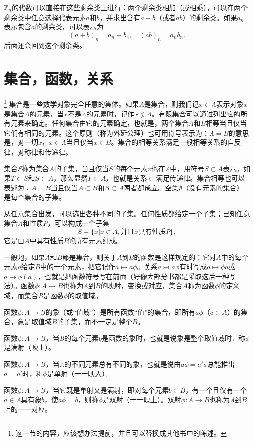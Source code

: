 $\mathbb{Z}_n$的代数可以直接在这些剩余类上进行：两个剩余类相加（或相乘），可以在两个剩余类中任意选择代表元素$a$和$b$，并求出含有$a+b$（或者$ab$）的剩余类。如果$a_n$表示包含$a$的剩余类，可以表示为
\[
(a+b)_n = a_n + b_n, \quad (ab)_n = a_nb_n.
\]
后面还会回到这个剩余类。


\section{集合，函数，关系}\label{subsection0010111}\footnote{这一节的内容，应该想办法提前，并且可以替换成其他书中的陈述。}
集合是一些数学对象完全任意的集体。如果$A$是集合，则我们记$x \in A$表示对象$x$是集合$A$的元素，当$x$不是$A$的元素时，记作$x \not\in A$。有限集合可以通过列出它的所有元素来确定。任何集合由它的元素确定，也就是，两个集合$A$和$B$相等当且仅当它们有相同的元素。这个原则（称为外延公理）也可用符号表示为：$A=B$的意思是，对一切$x$，$x \in A$当且仅当$x \in B$。集合的相等关系满足一般相等关系的自反律，对称律和传递律。

集合$S$称为集合$A$的子集，当且仅当$S$的每个元素$x$也在$A$中，用符号$S \subset A$表示。如果$T \subset S$和$S \subset A$，那么显然$T \subset A$，也就是关系$\subset$满足传递律。集合相等也可以表述为：$A=B$当且仅当$A \subset B$和$B \subset A$两者都成立。空集$\emptyset$（没有元素的集合）是每个集合的子集。

从任意集合出发，可以选出各种不同的子集。任何性质都给定一个子集；已知任意集合$A$和性质$P$，可以构成一个子集
\[
S = \{x | x \in A, \text{并且}x\text{具有性质}P\},
\]
它是由$A$中具有性质$P$的所有元素组成。

一般地，如果$A$和$B$都是集合，则关于$A$到$B$的函数是这样规定的：它对$A$中的每个元素$a$给定$B$中的一个元素，把它记作$a \mapsto a\phi$。关系$a \mapsto a\phi$有时写成$a \mapsto \phi{}a$或$a \mapsto \phi(a)$，也就是把函数符号写在前面（好像大部分书都是采取这后一种写法）。函数$\phi: A \to B$也称为$A$到$B$的映射，变换或对应，集合$A$称为函数$\phi$的定义域，而集合$B$是函数$\phi$的取值域。

函数$\phi: A \to B$的象（或“值域”）是所有函数“值”的集合，即所有$a\phi$（$a \in A$）的集合，象是取值域$B$的子集，而不一定是整个$B$。

函数$\phi:A \to B$，当$B$的每个元素$b$是函数的象时，也就是说象是整个取值域时，称$\phi$是满射（映上）。

函数$\phi:A \to B$，当$A$的不同元素总有不同的象，也就是说由$a\phi=a'\phi$总能推出$a=a'$时，称$\phi$是单射（一一映入）。

函数$\phi:A \to B$，当它既是单射又是满射，即对每个元素$b \in B$，有一个且仅有一个$a \in A$具有象$b$，使$a\phi = b$，则称$\phi$是双射（一一映上）。双射$\phi:A \to B$也称为$A$到$B$上的一一对应。

